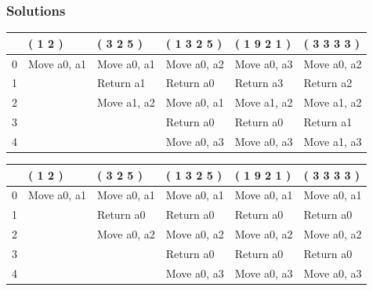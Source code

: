 \documentclass[12pt]{diazessay}
\newcounter{subsubsubsection}[subsubsection]
\begin{document}
\vspace{10pt}
        \subsubsection{Solutions}
\vspace{10pt}










\begin{tabular}{llllll}
\toprule
{} &      ( 1 2 ) &    ( 3 2 5 ) &  ( 1 3 2 5 ) &  ( 1 9 2 1 ) &  ( 3 3 3 3 ) \\
\midrule
0  &  Move a0, a1 &  Move a0, a1 &  Move a0, a2 &  Move a0, a3 &  Move a0, a2 \\
1  &              &    Return a1 &    Return a0 &    Return a3 &    Return a2 \\
2  &              &  Move a1, a2 &  Move a0, a1 &  Move a1, a2 &  Move a1, a2 \\
3  &              &              &    Return a0 &    Return a0 &    Return a1 \\
4  &              &              &  Move a0, a3 &  Move a0, a3 &  Move a1, a3 \\
\bottomrule
\end{tabular}

\vspace{1cm}

\begin{tabular}{llllll}
\toprule
{} &      ( 1 2 ) &    ( 3 2 5 ) &  ( 1 3 2 5 ) &  ( 1 9 2 1 ) &  ( 3 3 3 3 ) \\
\midrule
0  &  Move a0, a1 &  Move a0, a1 &  Move a0, a1 &  Move a0, a1 &  Move a0, a1 \\
1  &              &    Return a0 &    Return a0 &    Return a0 &    Return a0 \\
2  &              &  Move a0, a2 &  Move a0, a2 &  Move a0, a2 &  Move a0, a2 \\
3  &              &              &    Return a0 &    Return a0 &    Return a0 \\
4  &              &              &  Move a0, a3 &  Move a0, a3 &  Move a0, a3 \\
\bottomrule
\end{tabular}

\vspace{1cm}
\end{document}
